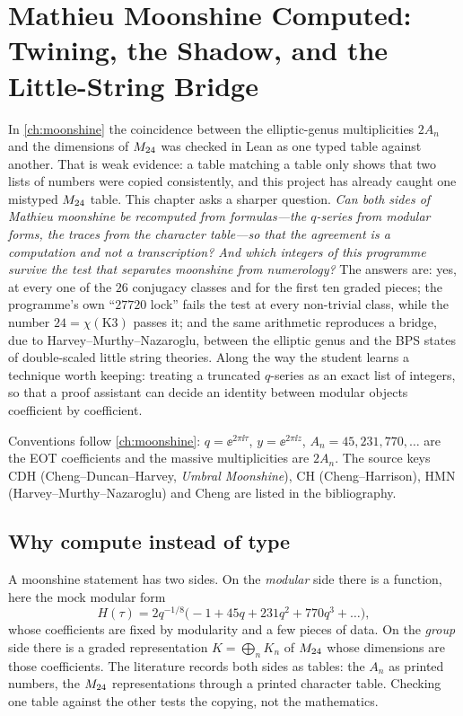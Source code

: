 \chapter{Mathieu Moonshine Computed: Twining, the Shadow, and the Little-String Bridge}\label{ch:moonshinecomputed}

In \cref{ch:moonshine} the coincidence between the elliptic-genus multiplicities
$2A_n$ and the dimensions of $M_{24}$ was checked in Lean as one typed table against
another. That is weak evidence: a table matching a table only shows that two lists of
numbers were copied consistently, and this project has already caught one mistyped
$M_{24}$ table. This chapter asks a sharper question. \emph{Can both sides of Mathieu
moonshine be recomputed from formulas---the $q$-series from modular forms, the traces from
the character table---so that the agreement is a computation and not a transcription? And
which integers of this programme survive the test that separates moonshine from
numerology?} The answers are: yes, at every one of the
$26$ conjugacy classes and for the first ten graded pieces; the programme's own ``$27720$
lock'' fails the test at every non-trivial class, while the number $24=\chi(\mathrm{K3})$
passes it; and the same arithmetic reproduces a bridge, due to Harvey--Murthy--Nazaroglu,
between the elliptic genus and the BPS states of double-scaled little string theories.
Along the way the student learns a technique worth keeping: treating a truncated
$q$-series as an exact list of integers, so that a proof assistant can decide an
identity between modular objects coefficient by coefficient.

Conventions follow \cref{ch:moonshine}: $q=\ee^{2\pi\ii\tau}$, $y=\ee^{2\pi\ii z}$,
$A_n=45,231,770,\dots$ are the EOT coefficients  and the
massive multiplicities are $2A_n$. The source keys CDH (Cheng--Duncan--Harvey,
\emph{Umbral Moonshine}), CH (Cheng--Harrison), HMN (Harvey--Murthy--Nazaroglu) and Cheng
are listed in the bibliography.

\section{Why compute instead of type}\label{sec:moonshinecomputed:why}

A moonshine statement has two sides. On the \emph{modular} side there is a function,
here the mock modular form
\begin{equation}\label{eq:moonshinecomputed:H}
  H(\tau)=2q^{-1/8}\bigl(-1+45q+231q^2+770q^3+\dots\bigr),
\end{equation}
whose coefficients are fixed by modularity and a few pieces of data. On the \emph{group}
side there is a graded representation $K=\bigoplus_nK_n$ of $M_{24}$ whose dimensions are
those coefficients. The literature records both sides as tables: the $A_n$ as printed
numbers, the $M_{24}$ representations through a printed character table. Checking one
table against the other tests the copying, not the mathematics.

